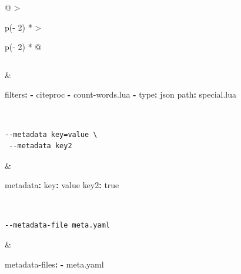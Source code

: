 \documentclass[
]{article}
\newenvironment{Shaded}{}{}
\newcommand{\AttributeTok}[1]{\textcolor[rgb]{0.49,0.56,0.16}{#1}}
\newcommand{\CharTok}[1]{\textcolor[rgb]{0.25,0.44,0.63}{#1}}
\newcommand{\FunctionTok}[1]{\textcolor[rgb]{0.02,0.16,0.49}{#1}}
\newcommand{\KeywordTok}[1]{\textcolor[rgb]{0.00,0.44,0.13}{\textbf{#1}}}
\begin{document}
\begin{longtable}[]{@{}
  >{\raggedright\arraybackslash}p{(\columnwidth - 2\tabcolsep) * }
  >{\raggedright\arraybackslash}p{(\columnwidth - 2\tabcolsep) * }@{}}
\begin{minipage}[t]{\linewidth}
\begin{verbatim}
\end{verbatim}
\end{minipage} & \begin{minipage}[t]{\linewidth}\raggedright
\begin{Shaded}
\begin{Highlighting}[]
\FunctionTok{filters}\KeywordTok{:}
\AttributeTok{  }\KeywordTok{{-}}\AttributeTok{ citeproc}
\AttributeTok{  }\KeywordTok{{-}}\AttributeTok{ count{-}words.lua}
\AttributeTok{  }\KeywordTok{{-}}\AttributeTok{ }\FunctionTok{type}\KeywordTok{:}\AttributeTok{ json}
\AttributeTok{    }\FunctionTok{path}\KeywordTok{:}\AttributeTok{ special.lua}
\end{Highlighting}
\end{Shaded}
\end{minipage} \\
\begin{minipage}[t]{\linewidth}\raggedright
\begin{verbatim}
--metadata key=value \
 --metadata key2
\end{verbatim}
\end{minipage} & \begin{minipage}[t]{\linewidth}\raggedright
\begin{Shaded}
\begin{Highlighting}[]
\FunctionTok{metadata}\KeywordTok{:}
\AttributeTok{  }\FunctionTok{key}\KeywordTok{:}\AttributeTok{ value}
\AttributeTok{  }\FunctionTok{key2}\KeywordTok{:}\AttributeTok{ }\CharTok{true}
\end{Highlighting}
\end{Shaded}
\end{minipage} \\
\begin{minipage}[t]{\linewidth}\raggedright
\begin{verbatim}
--metadata-file meta.yaml
\end{verbatim}
\end{minipage} & \begin{minipage}[t]{\linewidth}\raggedright
\begin{Shaded}
\begin{Highlighting}[]
\FunctionTok{metadata{-}files}\KeywordTok{:}
\AttributeTok{  }\KeywordTok{{-}}\AttributeTok{ meta.yaml}
\end{Highlighting}
\end{Shaded}


\end{minipage}
\end{longtable}
\end{document}

